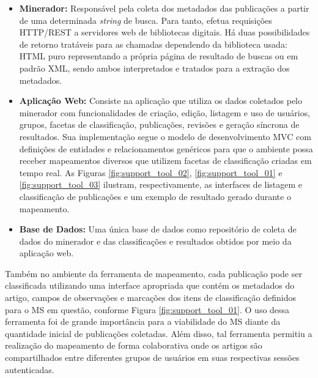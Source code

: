 \begin{itemize}

\item \textbf{Minerador:} Responsável pela coleta dos metadados das publicações a partir de uma determinada \textit{string} de busca. Para tanto, efetua requisições HTTP/REST a servidores web de bibliotecas digitais. Há duas possibilidades de retorno tratáveis para as chamadas dependendo da biblioteca usada: HTML puro representando a própria página de resultado de buscas ou em padrão XML, sendo ambos interpretados e tratados para a extração dos metadados. 

\item \textbf{Aplicação Web:} Consiste na aplicação que utiliza os dados coletados pelo minerador com funcionalidades de criação, edição, listagem e uso de usuários, grupos, facetas de classificação, publicações, revisões e geração síncrona de resultados. Sua implementação segue o modelo de desenvolvimento MVC com definições de entidades e relacionamentos genéricos para que o ambiente possa receber mapeamentos diversos que utilizem facetas de classificação criadas em tempo real. As Figuras \ref{fig:support_tool_02}, \ref{fig:support_tool_01} e \ref{fig:support_tool_03} ilustram, respectivamente, as interfaces de listagem e classificação de publicações e um exemplo de resultado gerado durante o mapeamento.

\item \textbf{Base de Dados:} Uma única base de dados como reposit\'{o}rio de coleta de dados do minerador e das classifica\c{c}\~{o}es e resultados obtidos por meio da aplicação web.

\end{itemize}

Também no ambiente da ferramenta de mapeamento, cada publicação pode ser classificada utilizando uma interface apropriada que contém os metadados do artigo, campos de observações e marcações dos itens de classificação definidos para o MS em questão, conforme Figura \ref{fig:support_tool_01}. O uso dessa ferramenta foi de grande importância para a viabilidade do MS diante da quantidade inicial de publicações coletadas. Al\'{e}m disso, tal ferramenta permitiu a realiza\c{c}\~{a}o do mapeamento de forma colaborativa onde os artigos s\~{a}o compartilhados entre diferentes grupos de usuários em suas respectivas sess\~{o}es autenticadas.

